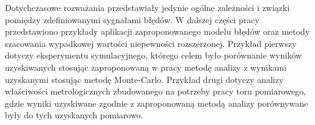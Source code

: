 Dotychczasowe rozważania przedstawiały jedynie ogólne zależności i związki pomiędzy zdefiniowanymi sygnałami błędów. W dalszej części pracy przedstawiono przykłady aplikacji zaproponowanego modelu błędów oraz metody szacowania wypadkowej wartości niepewności rozszerzonej. Przykład pierwszy dotyczy eksperymentu symulacyjnego, którego celem było porównanie wyników uzyskiwanych stosując zaproponowaną w pracy metodę analizy z wynikami uzyskanymi stosując metodę Monte-Carlo. Przykład drugi dotyczy analizy właściwości metrologicznych zbudowanego na potrzeby pracy toru pomiarowego, gdzie wyniki uzyskiwane zgodnie z zaproponowaną metodą analizy porównywane były do tych uzyskanych pomiarowo.
